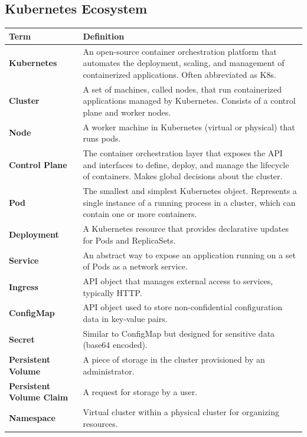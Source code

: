 \documentclass[11pt]{article}
\begin{document}
\subsection{Kubernetes Ecosystem}

\begin{longtable}{|p{}|p{}|}
\hline
\textbf{Term} & \textbf{Definition} \\
\hline
\endhead
\textbf{Kubernetes} & An open-source container orchestration platform that automates the deployment, scaling, and management of containerized applications. Often abbreviated as K8s. \\
\hline
\textbf{Cluster} & A set of machines, called nodes, that run containerized applications managed by Kubernetes. Consists of a control plane and worker nodes. \\
\hline
\textbf{Node} & A worker machine in Kubernetes (virtual or physical) that runs pods. \\
\hline
\textbf{Control Plane} & The container orchestration layer that exposes the API and interfaces to define, deploy, and manage the lifecycle of containers. Makes global decisions about the cluster. \\
\hline
\textbf{Pod} & The smallest and simplest Kubernetes object. Represents a single instance of a running process in a cluster, which can contain one or more containers. \\
\hline
\textbf{Deployment} & A Kubernetes resource that provides declarative updates for Pods and ReplicaSets. \\
\hline
\textbf{Service} & An abstract way to expose an application running on a set of Pods as a network service. \\
\hline
\textbf{Ingress} & API object that manages external access to services, typically HTTP. \\
\hline
\textbf{ConfigMap} & API object used to store non-confidential configuration data in key-value pairs. \\
\hline
\textbf{Secret} & Similar to ConfigMap but designed for sensitive data (base64 encoded). \\
\hline
\textbf{Persistent Volume} & A piece of storage in the cluster provisioned by an administrator. \\
\hline
\textbf{Persistent Volume Claim} & A request for storage by a user. \\
\hline
\textbf{Namespace} & Virtual cluster within a physical cluster for organizing resources. \\

\end{longtable}
\end{document}
